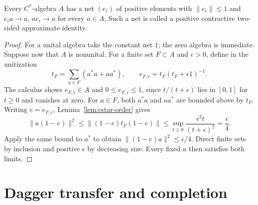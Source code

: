 \documentclass[11pt]{article}
\numberwithin{equation}{section}
\begin{document}
\begin{lemma}
\label{lem:cstar-approximate}
Every $C^*$-algebra $A$ has a net $(e_i)$ of positive elements with
$\|e_i\|\leq1$ and $e_i a\to a$, $a e_i\to a$ for every $a\in A$.
Such a net is called a positive contractive two-sided approximate identity.
\end{lemma}

\begin{proof}
For a unital algebra take the constant net $1$; the zero algebra is
immediate.  Suppose now that $A$ is nonunital.  For a finite set
$F\subset A$ and $\epsilon>0$, define in the unitization
\[
 t_F=\sum_{a\in F}(a^*a+aa^*),\qquad
 e_{F,\epsilon}=t_F(t_F+\epsilon1)^{-1}.
\]
The calculus shows $e_{F,\epsilon}\in A$ and
$0\leq e_{F,\epsilon}\leq1$, since $t/(t+\epsilon)$ lies in $[0,1]$
for $t\geq0$ and vanishes at zero.
For $a\in F$, both $a^*a$ and $aa^*$ are bounded above by $t_F$.
Writing $e=e_{F,\epsilon}$, Lemma~\ref{lem:cstar-order} gives
\[
 \|a(1-e)\|^2\leq\|(1-e)t_F(1-e)\|
 \leq\sup_{t\geq0}\frac{\epsilon^2 t}{(t+\epsilon)^2}
 =\frac\epsilon4.
\]
Apply the same bound to $a^*$ to obtain $\|(1-e)a\|^2\leq\epsilon/4$.
Direct finite sets by inclusion and positive $\epsilon$ by decreasing size.
Every fixed $a$ then satisfies both limits.
\end{proof}


\section{Dagger transfer and completion}
\end{document}
